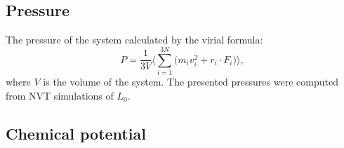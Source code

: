 \documentclass[a4paper,preprint,unsortedaddress,onecolumn,fleqn]{revtex4}
\begin{document}

\subsection{Pressure}

The pressure of the system calculated by the virial formula: 
\begin{equation*}
P=\frac{1}{3V}\Bigg\langle\sum_{i=1}^{3N}\Big(m_{i}\mathbf{\mathit{v}}%
_{i}^{2}+\mathbf{\mathit{r}}_{i}\cdot \mathbf{\mathit{F}}_{i}\Big)%
\Bigg\rangle,
\end{equation*}%
where $V$ is the volume of the system. The presented pressures were computed
from NVT simulations of $L_{0}$.

\subsection{Chemical potential}
\end{document}
